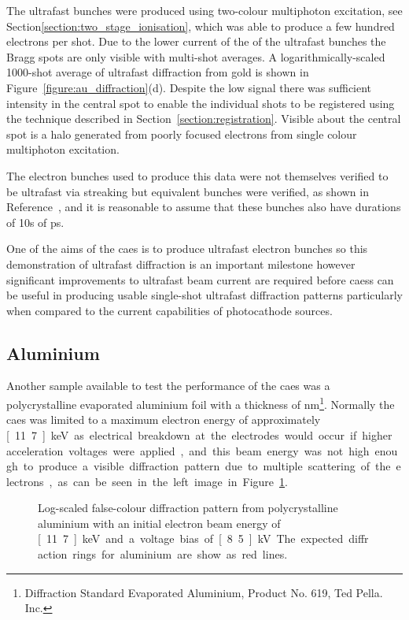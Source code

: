 The ultrafast bunches were produced using two-colour multiphoton excitation, see Section\ref{section:two_stage_ionisation}, which was able to produce a few hundred electrons per shot.
Due to the lower current of the of the ultrafast bunches the Bragg spots are only visible with multi-shot averages.
A logarithmically-scaled 1000-shot average of ultrafast diffraction from gold is shown in Figure~\ref{figure:au_diffraction}(d).
Despite the low signal there was sufficient intensity in the central spot to enable the individual shots to be registered using the technique described in Section~\ref{section:registration}.
Visible about the central spot is a halo generated from poorly focused electrons from single colour multiphoton excitation.

The electron bunches used to produce this data were not themselves verified to be ultrafast via streaking but equivalent bunches were verified, as shown in Reference~\cite{speirs_identification_2017}, and it is reasonable to assume that these bunches also have durations of 10s of ps.

One of the aims of the \gls{caes} is to produce ultrafast electron bunches so this demonstration of ultrafast diffraction is an important milestone however significant improvements to ultrafast beam current are required before \glspl{caes} can be useful in producing usable single-shot ultrafast diffraction patterns particularly when compared to the current capabilities of photocathode sources.

\subsection{Aluminium}\label{section:aluminium_diffraction}

Another sample available to test the performance of the \gls{caes} was a polycrystalline evaporated aluminium foil with a thickness of \unit[31]{nm}\footnote{Diffraction Standard Evaporated Aluminium, Product No. 619, Ted Pella. Inc.}.
Normally the \gls{caes} was limited to a maximum electron energy of approximately \unit[11.7]{keV} as electrical breakdown at the electrodes would occur if higher acceleration voltages were applied, and this beam energy was not high enough to produce a visible diffraction pattern due to multiple scattering of the electrons, as can be seen in the left image in Figure~\ref{figure:al_diffraction}.

\begin{figure}
    \center
    
    \caption[Diffraction patterns from aluminium.]{Log-scaled false-colour diffraction pattern from polycrystalline aluminium with an initial electron beam energy of \unit[11.7]{keV} and a voltage bias of \unit[8.5]{kV}. The expected diffraction rings for aluminium are show as red lines.}
    \label{figure:al_diffraction}
\end{figure}

